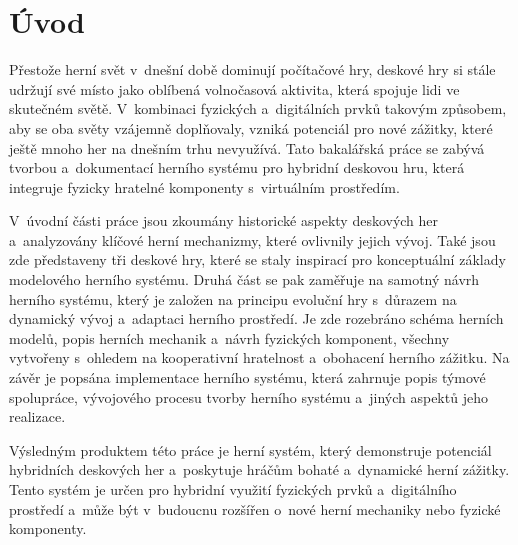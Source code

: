 \chapter{Úvod}

Přestože herní svět v~dnešní době dominují počítačové hry, deskové hry si stále udržují své místo jako oblíbená volnočasová aktivita, která spojuje lidi ve skutečném světě. V~kombinaci fyzických a~digitálních prvků takovým způsobem, aby se oba světy vzájemně doplňovaly, vzniká potenciál pro nové zážitky, které ještě mnoho her na dnešním trhu nevyužívá. Tato bakalářská práce se zabývá tvorbou a~dokumentací herního systému pro hybridní deskovou hru, která integruje fyzicky hratelné komponenty s~virtuálním prostředím.

V~úvodní části práce jsou zkoumány historické aspekty deskových her a~analyzovány klíčové herní mechanizmy, které ovlivnily jejich vývoj. Také jsou zde představeny tři deskové hry, které se staly inspirací pro konceptuální základy modelového herního systému. Druhá část se pak zaměřuje na samotný návrh herního systému, který je založen na principu evoluční hry s~důrazem na dynamický vývoj a~adaptaci herního prostředí. Je zde rozebráno schéma herních modelů, popis herních mechanik a~návrh fyzických komponent, všechny vytvořeny s~ohledem na kooperativní hratelnost a~obohacení herního zážitku. Na závěr je popsána implementace herního systému, která zahrnuje popis týmové spolupráce, vývojového procesu tvorby herního systému a~jiných aspektů jeho realizace. 

Výsledným produktem této práce je herní systém, který demonstruje potenciál hybridních deskových her a~poskytuje hráčům bohaté a~dynamické herní zážitky. Tento systém je určen pro hybridní využití fyzických prvků a~digitálního prostředí a~může být v~budoucnu rozšířen o~nové herní mechaniky nebo fyzické komponenty.
